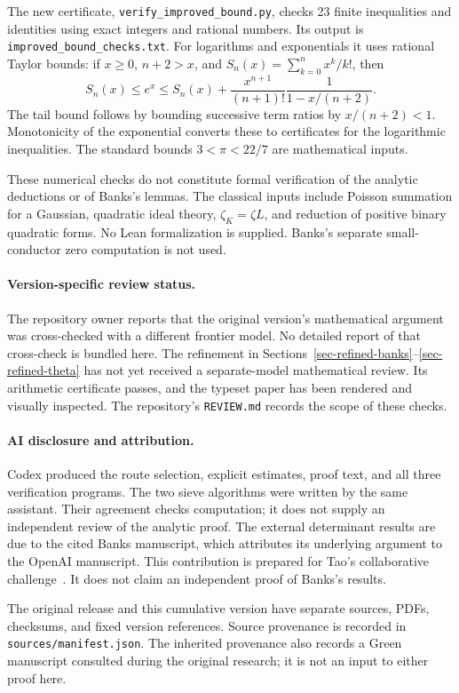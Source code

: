 \documentclass[11pt]{article}
\newcommand{\zK}{\zeta_K}
\begin{document}
The new certificate, \texttt{verify\_improved\_bound.py}, checks
23 finite inequalities and identities using exact integers and rational
numbers. Its output is \texttt{improved\_bound\_checks.txt}.
For logarithms and exponentials it uses rational Taylor bounds:
if \(x\ge0\), \(n+2>x\), and \(S_n(x)=\sum_{k=0}^n x^k/k!\), then
\[
 S_n(x)\le e^x\le S_n(x)
 +\frac{x^{n+1}}{(n+1)!}\frac1{1-x/(n+2)}.
\]
The tail bound follows by bounding successive term ratios by
\(x/(n+2)<1\). Monotonicity of the exponential converts these to
certificates for the logarithmic inequalities. The standard bounds
\(3<\pi<22/7\) are mathematical inputs.

These numerical checks do not constitute formal verification of the
analytic deductions or of Banks's lemmas. The classical inputs include
Poisson summation for a Gaussian, quadratic ideal theory,
\(\zK=\zeta L\), and reduction of positive binary quadratic forms.
No Lean formalization is supplied. Banks's separate small-conductor
zero computation is not used.

\paragraph{Version-specific review status.}
The repository owner reports that the original version's mathematical
argument was cross-checked with a different frontier model. No detailed
report of that cross-check is bundled here. The refinement in
Sections~\ref{sec-refined-banks}--\ref{sec-refined-theta} has not yet
received a separate-model mathematical review. Its arithmetic certificate
passes, and the typeset paper has been rendered and visually inspected.
The repository's \texttt{REVIEW.md} records the scope of these checks.

\paragraph{AI disclosure and attribution.}
Codex produced the route selection, explicit estimates, proof text,
and all three verification programs. The two sieve algorithms were
written by the same assistant. Their agreement checks computation;
it does not supply an independent review of the analytic proof.
The external determinant results are due to the cited Banks manuscript,
which attributes its underlying argument to the OpenAI manuscript.
This contribution is prepared for Tao's collaborative challenge~\cite{tao}.
It does not claim an independent proof of Banks's results.

The original release and this cumulative version have separate sources,
PDFs, checksums, and fixed version references. Source provenance is
recorded in \texttt{sources/manifest.json}. The inherited provenance
also records a Green manuscript consulted during the original research;
it is not an input to either proof here.
\end{document}
